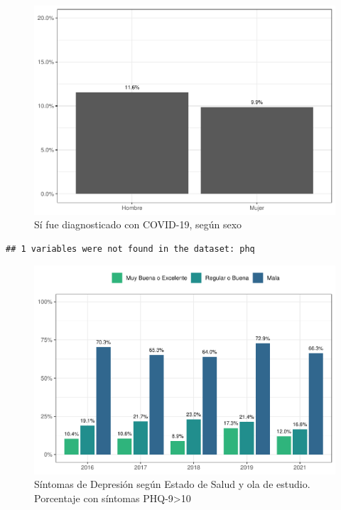 \documentclass[
  12pt,
  openany]{book}
\begin{document}
\begin{figure}

{\centering \includegraphics{reporte-elsoc_files/figure-latex/covid-sexo-1} 

}

\caption{Sí fue diagnosticado con COVID-19, según sexo}\label{fig:covid-sexo}
\end{figure}

\begin{verbatim}
## 1 variables were not found in the dataset: phq
\end{verbatim}

\begin{figure}

{\centering \includegraphics{reporte-elsoc_files/figure-latex/depre-s03-1} 

}

\caption{Síntomas de Depresión según Estado de Salud y ola de estudio. Porcentaje con síntomas PHQ-9>10}\label{fig:depre-s03}
\end{figure}
\end{document}
